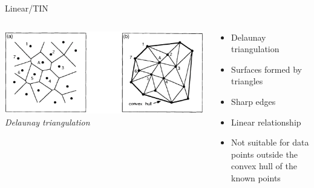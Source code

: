 \begin{frame}{Linear/TIN}
\begin{columns}[c] %
	\begin{column}{.48\textwidth}
		\includegraphics[trim=292 0 0 0,clip,width=\linewidth]{../writeup/images/voronoi_delauny.png}\\
		\textit{\footnotesize Delaunay triangulation \cite{sambridge_geophysical_1995}}
	\end{column}%
	\hfill%
	\begin{column}{.52\textwidth}
		\begin{itemize}
			\item Delaunay triangulation
			\item Surfaces formed by triangles
			\item Sharp edges
			\item Linear relationship
			\item Not suitable for data points outside the convex hull of the known points
		\end{itemize}
	\end{column}%
\end{columns}
\end{frame}
